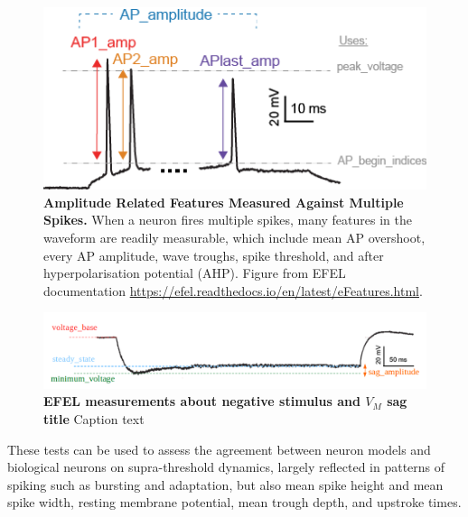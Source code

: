 \begin{figure}
\centering
\includegraphics{figures/AP_Amplitude.png}
\caption[Amplitude Features Measured Against Multiple Spikes]{\textbf{Amplitude Related Features Measured Against Multiple Spikes.} When a neuron fires multiple spikes, many features in the waveform are readily measurable, which include mean AP overshoot, every AP amplitude, wave troughs, spike threshold, and after hyperpolarisation potential (AHP). Figure from EFEL documentation \url{https://efel.readthedocs.io/en/latest/eFeatures.html}.
    }
\label{fig:features_example}
\end{figure}

\begin{figure}
\begin{center}
\includegraphics{figures/sag_amplitude}
\end{center}
\caption[EFEL measurements about negative stimulus and $V_{M}$ sag]{\textbf{EFEL measurements about negative stimulus and $V_{M}$ sag title} Caption text}
\label{fig:sag_amplitude}
\end{figure}


These tests can be used to assess the agreement between neuron models and biological neurons on supra-threshold dynamics, largely reflected in patterns of spiking such as bursting and adaptation, but also mean spike height and mean spike width, resting membrane potential, mean trough depth, and upstroke times.

